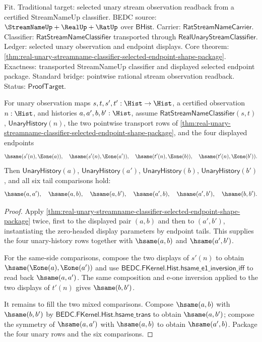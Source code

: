 Fit. Traditional target: selected unary stream observation readback from a
certified StreamNameUp classifier. BEDC source: $\StreamNameUp+\RealUp+\RatUp$
over $\mathsf{BHist}$. Carrier: $\mathsf{RatStreamNameCarrier}$. Classifier:
$\mathsf{RatStreamNameClassifier}$ transported through
$\mathsf{RealUnaryStreamClassifier}$. Ledger: selected unary observation and
endpoint displays. Core theorem:
\autoref{thm:real-unary-streamname-classifier-selected-endpoint-shape-package}.
Exactness: transported StreamNameUp classifier and displayed selected endpoint
package. Standard bridge: pointwise rational stream observation readback.
Status: $\mathsf{ProofTarget}$.

\begin{theorem}
\label{thm:real-unary-streamname-classifier-selected-endpoint-tail-pairwise-coherence}
For unary observation maps $s,t,s',t':\Hist\to\Hist$, a certified observation
$n:\Hist$, and histories $a,a',b,b':\Hist$, assume
$\mathsf{RatStreamNameClassifier}(s,t)$, $\mathsf{UnaryHistory}(n)$, the two
pointwise transport rows of
\autoref{thm:real-unary-streamname-classifier-selected-endpoint-shape-package},
and the four displayed endpoints
$$
\hsame(s'(n),\Eone(a)),\quad \hsame(s'(n),\Eone(a')),\quad
\hsame(t'(n),\Eone(b)),\quad \hsame(t'(n),\Eone(b')).
$$
Then $\mathsf{UnaryHistory}(a)$, $\mathsf{UnaryHistory}(a')$,
$\mathsf{UnaryHistory}(b)$, $\mathsf{UnaryHistory}(b')$, and all six tail
comparisons hold:
$$
\hsame(a,a'),\quad \hsame(a,b),\quad \hsame(a,b'),\quad
\hsame(a',b),\quad \hsame(a',b'),\quad \hsame(b,b').
$$
\end{theorem}
\begin{proof}
Apply
\autoref{thm:real-unary-streamname-classifier-selected-endpoint-shape-package}
twice, first to the displayed pair $(a,b)$ and then to $(a',b')$, instantiating
the zero-headed display parameters by endpoint tails. This supplies the four
unary-history rows together with $\hsame(a,b)$ and $\hsame(a',b')$.

For the same-side comparisons, compose the two displays of $s'(n)$ to obtain
$\hsame(\Eone(a),\Eone(a'))$ and use
$\mathsf{BEDC.FKernel.Hist.hsame\_e1\_inversion\_iff}$ to read back
$\hsame(a,a')$. The same composition and e-one inversion applied to the two
displays of $t'(n)$ gives $\hsame(b,b')$.

It remains to fill the two mixed comparisons. Compose $\hsame(a,b)$ with
$\hsame(b,b')$ by $\mathsf{BEDC.FKernel.Hist.hsame\_trans}$ to obtain
$\hsame(a,b')$; compose the symmetry of $\hsame(a,a')$ with $\hsame(a,b)$ to
obtain $\hsame(a',b)$. Package the four unary rows and the six comparisons.
\end{proof}

